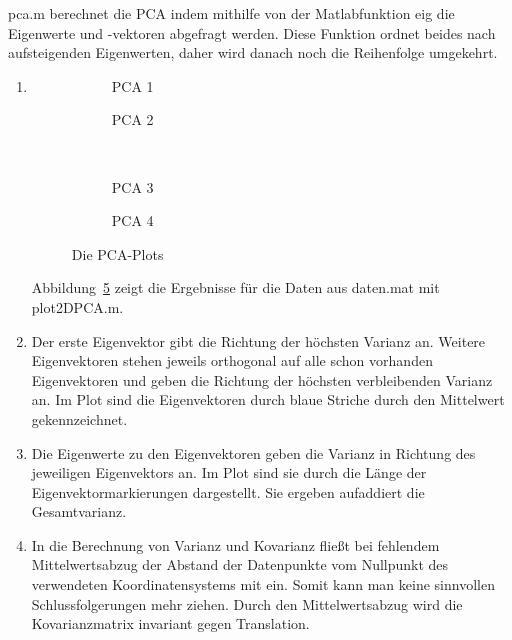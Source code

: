 \documentclass[]{report}
\newlength\figureheight
\newlength\figurewidth
\begin{document}
\begin{enumerate}
		pca.m berechnet die PCA indem mithilfe von der Matlabfunktion eig die Eigenwerte und -vektoren abgefragt werden. Diese Funktion ordnet beides nach aufsteigenden Eigenwerten, daher wird danach noch die Reihenfolge umgekehrt.
		\begin{enumerate}
			
			\item
			\setlength\figureheight{3.5cm}
			\setlength{}
			\begin{figure}
				\begin{subfigure}{0.45\textwidth}
					\centering
					
					\caption{PCA 1}
					\label{fig:pca1}
				\end{subfigure}
				\qquad
				\begin{subfigure}{0.45\textwidth}
					\centering
					
					\caption{PCA 2}
					\label{fig:pca2}
				\end{subfigure}	
				\\
				\begin{subfigure}{0.45\textwidth}
					\centering
					
					\caption{PCA 3}
					\label{fig:pca3}
				\end{subfigure}
				\qquad
				\begin{subfigure}{0.45\textwidth}
					\centering
					
					\caption{PCA 4}
					\label{fig:pca4}
				\end{subfigure}	
				\caption{Die PCA-Plots}
				\label{fig:pca}
			\end{figure}
			
			Abbildung~\ref{fig:pca} zeigt die Ergebnisse für die Daten aus daten.mat mit plot2DPCA.m.
			\item
			Der erste Eigenvektor gibt die Richtung der höchsten Varianz an. Weitere Eigenvektoren stehen jeweils orthogonal auf alle schon vorhanden Eigenvektoren und geben die Richtung der höchsten verbleibenden Varianz an. Im Plot sind die Eigenvektoren durch blaue Striche durch den Mittelwert gekennzeichnet.
			\item
			Die Eigenwerte zu den Eigenvektoren geben die Varianz in Richtung des jeweiligen Eigenvektors an. Im Plot sind sie durch die Länge der Eigenvektormarkierungen dargestellt. Sie ergeben aufaddiert die Gesamtvarianz.
			\item
			In die Berechnung von Varianz und Kovarianz fließt bei fehlendem Mittelwertsabzug der Abstand der Datenpunkte vom Nullpunkt des verwendeten Koordinatensystems mit ein. Somit kann man keine sinnvollen Schlussfolgerungen mehr ziehen. Durch den Mittelwertsabzug wird die Kovarianzmatrix invariant gegen Translation. 
			

\end{enumerate}
\end{enumerate}
\end{document}

